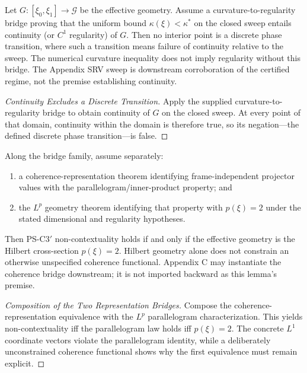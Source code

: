 \begin{corollary}
\label{corollary:bk7_bridge_no_interior_transition}
Let $G:[\xi_0,\xi_1]\to\mathcal G$ be the effective geometry.  Assume a
curvature-to-regularity bridge proving that the uniform bound
$\kappa(\xi)<\kappa^*$ on the closed sweep entails continuity (or $C^1$
regularity) of $G$.  Then no interior point is a discrete phase transition,
where such a transition means failure of continuity relative to the sweep.
The numerical curvature inequality does not imply regularity without this
bridge.  The Appendix SRV sweep is downstream corroboration of the certified
regime, not the premise establishing continuity.
\end{corollary}
\begin{proof}[Continuity Excludes a Discrete Transition]
\label{proof:bk7_bridge_no_interior_transition}
\leavevmode
Apply the supplied curvature-to-regularity bridge to obtain continuity of
$G$ on the closed sweep.  At every point of that domain, continuity within the
domain is therefore true, so its negation---the defined discrete phase
transition---is false.
\end{proof}

\begin{lemma}
\label{lemma:bk7_noncontextuality_forces_hilbert}
Along the bridge family, assume separately:
\begin{enumerate}
\item a coherence-representation theorem identifying frame-independent
projector values with the parallelogram/inner-product property; and
\item the $L^p$ geometry theorem identifying that property with $p(\xi)=2$
under the stated dimensional and regularity hypotheses.
\end{enumerate}
Then PS-C3$'$ non-contextuality holds if and only if the effective geometry is
the Hilbert cross-section $p(\xi)=2$.  Hilbert geometry alone does not constrain
an otherwise unspecified coherence functional.  Appendix C may instantiate
the coherence bridge downstream; it is not imported backward as this lemma's
premise.
\end{lemma}

\begin{proof}[Composition of the Two Representation Bridges]
\label{proof:bk7_noncontextuality_forces_hilbert}
\leavevmode
Compose the coherence-representation equivalence with the $L^p$
parallelogram characterization.  This yields non-contextuality iff the
parallelogram law holds iff $p(\xi)=2$.  The concrete $L^1$ coordinate vectors
violate the parallelogram identity, while a deliberately unconstrained
coherence functional shows why the first equivalence must remain explicit.
\end{proof}

